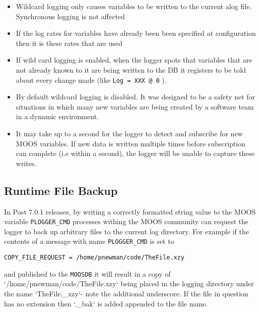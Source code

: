 \documentclass[a4paper,10pt]{article}
\newcommand{\Code}[1]{\texttt{#1} }
\newcommand{\code}[1]{\Code{#1} }
\newcommand{\DB}   {\code{{MOOSDB}}}
\begin{document}
\begin{itemize}
\item Wildcard logging only causes variables to be written to the current alog file. Synchronous logging is not affected
\item If the log rates for variables have already been been specified at configuration then it is these rates that are used
\item If wild card logging is enabled, when the logger spots that variables that are not already known to it are being written to the DB it registers to be told about every change made (like \code{Log = XXX @ 0}).
\item By default wildcard logging is disabled. It was designed to be a safety net for situations in which many new variables are being created by a software team in a dynamic environment.
\item It may take up to a second for the logger to detect and subscribe for new MOOS variables. If new data is written multiple times before subscription can complete (i.e within a second), the logger will be unable to capture these writes.
\end{itemize}



\subsection{Runtime File Backup}
In Post 7.0.1 releases, by writing a correctly formatted string value to the MOOS variable \code{PLOGGER\_CMD} processes withing the MOOS community can request the logger to back up arbitrary files to the current log directory. For example if the contents of a message with name \code{PLOGGER\_CMD} is set to
\begin{center}
\code{COPY\_FILE\_REQUEST = /home/pnewman/code/TheFile.xzy}
\end{center}
 and published to the \DB  it will result in a copy of `/home/pnewman/code/TheFile.xzy` being placed in the logging directory under the name `TheFile.\_xzy`- note the additional underscore. If the file in question has no extension then `.\_bak` is added appended to the file name.
\end{document}
